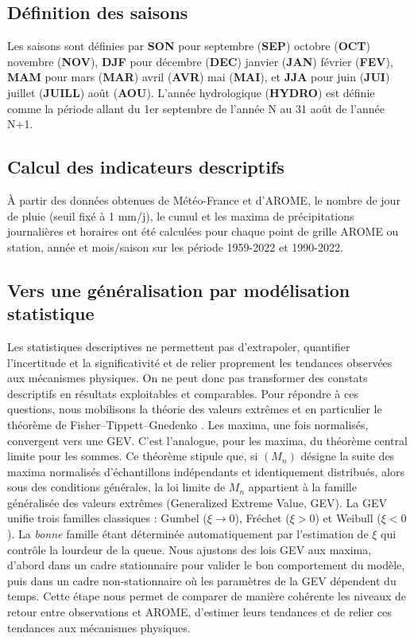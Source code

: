 \documentclass[
  article,
  nofooter,
  noheadings]{jss}
\begin{document}
\subsection{Définition des saisons}\label{duxe9finition-des-saisons}

Les saisons sont définies par \textbf{SON} pour septembre (\textbf{SEP})
octobre (\textbf{OCT}) novembre (\textbf{NOV}), \textbf{DJF} pour
décembre (\textbf{DEC}) janvier (\textbf{JAN}) février (\textbf{FEV}),
\textbf{MAM} pour mars (\textbf{MAR}) avril (\textbf{AVR}) mai
(\textbf{MAI}), et \textbf{JJA} pour juin (\textbf{JUI}) juillet
(\textbf{JUILL}) août (\textbf{AOU}). L'année hydrologique
(\textbf{HYDRO}) est définie comme la période allant du 1er septembre de
l'année N au 31 août de l'année N+1.

\subsection{Calcul des indicateurs
descriptifs}\label{calcul-des-indicateurs-descriptifs}

À partir des données obtenues de Météo-France et d'AROME, le nombre de
jour de pluie (seuil fixé à 1 mm/j), le cumul et les maxima de
précipitations journalières et horaires ont été calculées pour chaque
point de grille AROME ou station, année et mois/saison sur les période
1959-2022 et 1990-2022.

\subsection{Vers une généralisation par modélisation
statistique}\label{vers-une-guxe9nuxe9ralisation-par-moduxe9lisation-statistique}

Les statistiques descriptives ne permettent pas d'extrapoler, quantifier
l'incertitude et la significativité et de relier proprement les
tendances observées aux mécanismes physiques. On ne peut donc pas
transformer des constats descriptifs en résultats exploitables et
comparables. Pour répondre à ces questions, nous mobilisons la théorie
des valeurs extrêmes et en particulier le théorème de
Fisher--Tippett--Gnedenko \citep{coles2001introduction}. Les maxima, une
fois normalisés, convergent vers une GEV. C'est l'analogue, pour les
maxima, du théorème central limite pour les sommes. Ce théorème stipule
que, si \((M_n)\) désigne la suite des maxima normalisés d'échantillons
indépendants et identiquement distribués, alors sous des conditions
générales, la loi limite de \(M_n\) appartient à la famille généralisée
des valeurs extrêmes (Generalized Extreme Value, GEV). La GEV unifie
trois familles classiques : Gumbel (\(\xi \to 0\)), Fréchet
(\(\xi > 0\)) et Weibull (\(\xi < 0\)). La \emph{bonne} famille étant
déterminée automatiquement par l'estimation de \(\xi\) qui contrôle la
lourdeur de la queue. Nous ajustons des lois GEV aux maxima, d'abord
dans un cadre stationnaire pour valider le bon comportement du modèle,
puis dans un cadre non‑stationnaire où les paramètres de la GEV
dépendent du temps. Cette étape nous permet de comparer de manière
cohérente les niveaux de retour entre observations et AROME, d'estimer
leurs tendances et de relier ces tendances aux mécanismes physiques.
\end{document}
